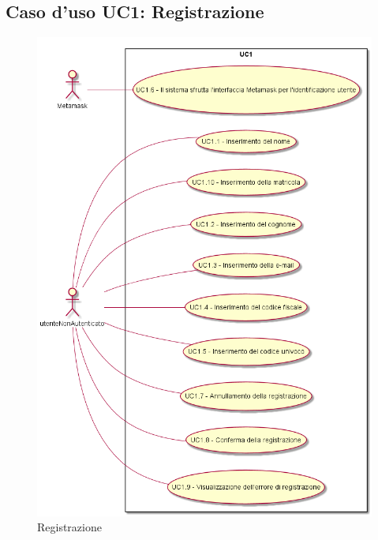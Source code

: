 \subsection{Caso d'uso \texorpdfstring{UC1}{UC1}: Registrazione }
\begin{figure} [H]
\centering
\includegraphics[scale=0.45]{./img/UC1.png}
\caption{Registrazione }\label{}
\end{figure}
